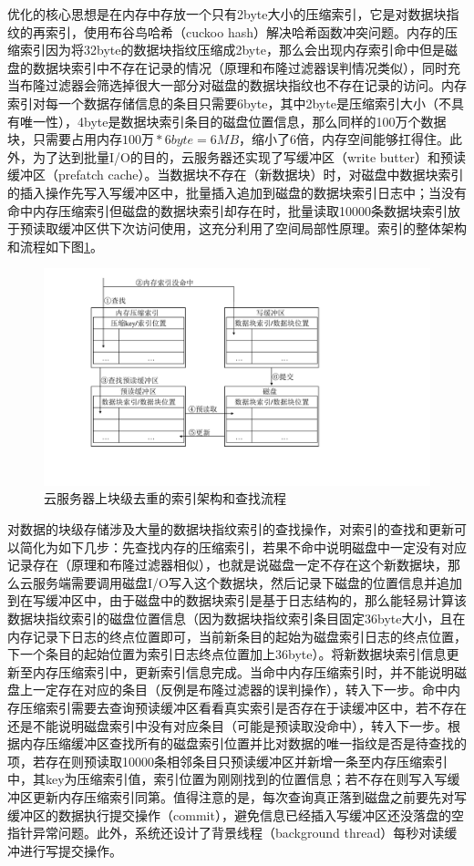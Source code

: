 \documentclass[promaster]{thesis-uestc}
\begin{document}
优化的核心思想是在内存中存放一个只有2byte大小的压缩索引，它是对数据块指纹的再索引，使用布谷鸟哈希（cuckoo hash）解决哈希函数冲突问题。内存的压缩索引因为将32byte的数据块指纹压缩成2byte，那么会出现内存索引命中但是磁盘的数据块索引中不存在记录的情况（原理和布隆过滤器误判情况类似），同时充当布隆过滤器会筛选掉很大一部分对磁盘的数据块指纹也不存在记录的访问。内存索引对每一个数据存储信息的条目只需要6byte，其中2byte是压缩索引大小（不具有唯一性），4byte是数据块索引条目的磁盘位置信息，那么同样的100万个数据块，只需要占用内存$100万 * 6byte = 6MB$，缩小了6倍，内存空间能够扛得住。此外，为了达到批量I/O的目的，云服务器还实现了写缓冲区（write butter）和预读缓冲区（prefatch cache）。当数据块不存在（新数据块）时，对磁盘中数据块索引的插入操作先写入写缓冲区中，批量插入追加到磁盘的数据块索引日志中；当没有命中内存压缩索引但磁盘的数据块索引却存在时，批量读取10000条数据块索引放于预读取缓冲区供下次访问使用，这充分利用了空间局部性原理。索引的整体架构和流程如下图\ref{云服务器上块级去重的索引架构和查找流程}。
\begin{figure}[htbp]
    \centering
    \includegraphics[width = 0.8\linewidth]{pic/云服务器上块级重删的索引架构和查找流程.pdf}
    \caption{云服务器上块级去重的索引架构和查找流程}
    \label{云服务器上块级去重的索引架构和查找流程}
\end{figure}

对数据的块级存储涉及大量的数据块指纹索引的查找操作，对索引的查找和更新可以简化为如下几步：先查找内存的压缩索引，若果不命中说明磁盘中一定没有对应记录存在（原理和布隆过滤器相似），也就是说磁盘一定不存在这个新数据块，那么云服务端需要调用磁盘I/O写入这个数据块，然后记录下磁盘的位置信息并追加到在写缓冲区中，由于磁盘中的数据块索引是基于日志结构的，那么能轻易计算该数据块指纹索引的磁盘位置信息（因为数据块指纹索引条目固定36byte大小，且在内存记录下日志的终点位置即可，当前新条目的起始为磁盘索引日志的终点位置，下一个条目的起始位置为索引日志终点位置加上36byte）。将新数据块索引信息更新至内存压缩索引中，更新索引信息完成。当命中内存压缩索引时，并不能说明磁盘上一定存在对应的条目（反例是布隆过滤器的误判操作），转入下一步。命中内存压缩索引需要去查询预读缓冲区看看真实索引是否存在于读缓冲区中，若不存在还是不能说明磁盘索引中没有对应条目（可能是预读取没命中），转入下一步。根据内存压缩缓冲区查找所有的磁盘索引位置并比对数据的唯一指纹是否是待查找的项，若存在则预读取10000条相邻条目只预读缓冲区并新增一条至内存压缩索引中，其key为压缩索引值，索引位置为刚刚找到的位置信息；若不存在则写入写缓冲区更新内存压缩索引同第。值得注意的是，每次查询真正落到磁盘之前要先对写缓冲区的数据执行提交操作（commit），避免信息已经插入写缓冲区还没落盘的空指针异常问题。此外，系统还设计了背景线程（background thread）每秒对读缓冲进行写提交操作。
\end{document}
